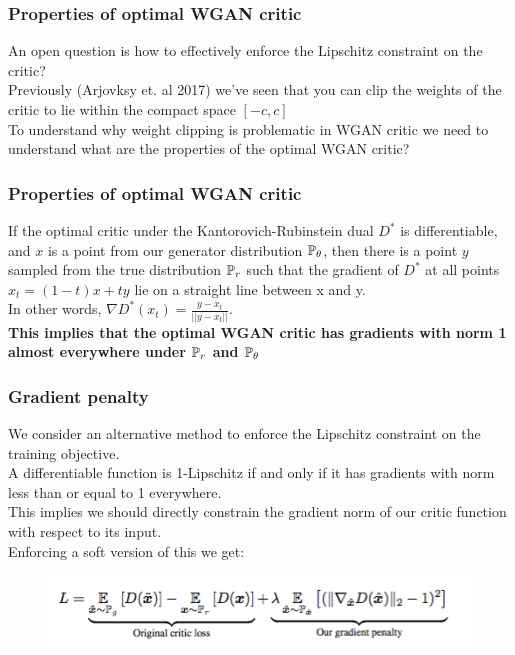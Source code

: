 \documentclass{beamer}
\begin{document}
\begin{frame}
\frametitle{Properties of optimal WGAN critic}
\pause
An open question is how to effectively enforce the Lipschitz constraint on the critic?\\
\vspace{0.12in}
\pause
Previously (Arjovksy et. al 2017) we've seen that you can clip the weights of the critic to lie within the compact space $[-c,c]$\\
\vspace{0.12in}
\pause
To understand why weight clipping is problematic in WGAN critic we need to understand what are the properties of the optimal WGAN critic?\\

\end{frame}

\begin{frame}
\frametitle{Properties of optimal WGAN critic}
\pause
If the optimal critic under the Kantorovich-Rubinstein dual $D^{*}$ is differentiable, and $x$ is a point from our generator distribution $\P_{\theta}$, then there is a point $y$ sampled from the true distribution $\P_{r}$ such that the gradient of $D^{*}$ at all points $x_{t} = (1-t)x + ty$ lie on a straight line between x and y.\\
\vspace{0.12in}
\pause
In other words, $\nabla D^{*}(x_t) = \frac{y - x_{t}}{||y-x_t||}$.\\
\vspace{0.12in}
\pause
\textbf{This implies that the optimal WGAN critic has gradients with norm 1 almost everywhere under $\P_{r}$ and $\P_{\theta}$}

\end{frame}

\begin{frame}
\frametitle{Gradient penalty}
\pause
We consider an alternative method to enforce the Lipschitz constraint on the training objective.\\
\vspace{0.12in}
\pause
A differentiable function is 1-Lipschitz if and only if it has gradients with norm less than or equal to 1 everywhere. \\
\vspace{0.12in}
\pause
This implies we should directly constrain the gradient norm of our critic function with respect to its input. \\
\vspace{0.12in}
\pause
Enforcing a soft version of this we get:

\begin{figure}
\centering
\includegraphics[width=1\textwidth]{penalty.png}
\end{figure}

\end{frame}
\end{document}
